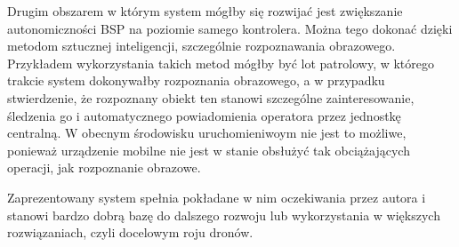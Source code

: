 Drugim obszarem w którym system mógłby się rozwijać jest zwiększanie autonomiczności BSP na poziomie samego kontrolera. Można tego dokonać dzięki metodom sztucznej inteligencji, szczególnie rozpoznawania obrazowego. Przykładem wykorzystania takich metod mógłby być lot patrolowy, w którego trakcie system dokonywałby rozpoznania obrazowego, a w przypadku stwierdzenie, że rozpoznany obiekt ten stanowi szczególne zainteresowanie, śledzenia go i automatycznego powiadomienia operatora przez jednostkę centralną. W obecnym środowisku uruchomieniwoym nie jest to możliwe, ponieważ urządzenie mobilne nie jest w stanie obsłużyć tak obciążających operacji, jak rozpoznanie obrazowe.

Zaprezentowany system spełnia pokładane w nim oczekiwania przez autora i stanowi bardzo dobrą bazę do dalszego rozwoju lub wykorzystania w większych rozwiązaniach, czyli docelowym roju dronów.


